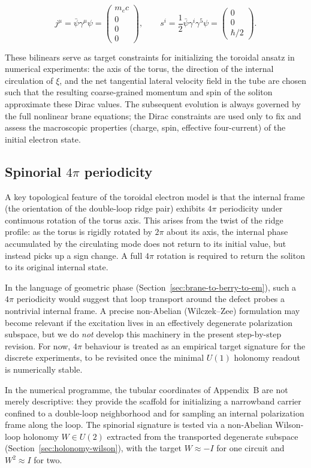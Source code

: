\begin{equation}
j^\mu = \bar\psi \gamma^\mu \psi
= \begin{pmatrix} m_e c \\ 0 \\ 0 \\ 0 \end{pmatrix},
\qquad
s^i = \frac{1}{2} \bar\psi \gamma^i \gamma^5 \psi
= \begin{pmatrix} 0 \\ 0 \\ \hbar/2 \end{pmatrix}.
\label{eq:dirac-rest-bilinears}
\end{equation}

These bilinears serve as target constraints for initializing the toroidal ansatz
in numerical experiments: the axis of the torus, the direction of the internal
circulation of $\xi$, and the net tangential lateral velocity field in the tube
are chosen such that the resulting coarse-grained momentum and spin of the
soliton approximate these Dirac values. The subsequent evolution is always
governed by the full nonlinear brane equations; the Dirac constraints are used
only to fix and assess the macroscopic properties (charge, spin, effective
four-current) of the initial electron state.

\subsection{Spinorial $4\pi$ periodicity}

A key topological feature of the toroidal electron model is that the internal
frame (the orientation of the double-loop ridge pair) exhibits $4\pi$
periodicity under continuous rotation of the torus axis. This arises from the
twist of the ridge profile: as the torus is rigidly rotated by $2\pi$ about its
axis, the internal phase accumulated by the circulating mode does not return to
its initial value, but instead picks up a sign change. A full $4\pi$ rotation is
required to return the soliton to its original internal state.

In the language of geometric phase (Section~\ref{sec:brane-to-berry-to-em}), such a $4\pi$ periodicity would suggest that
loop transport around the defect probes a nontrivial internal frame.
A precise non-Abelian (Wilczek--Zee) formulation may become relevant if the excitation lives in an effectively degenerate
polarization subspace, but we do \emph{not} develop this machinery in the present step-by-step revision.
For now, $4\pi$ behaviour is treated as an empirical target signature for the discrete experiments, to be revisited once the
minimal $U(1)$ holonomy readout is numerically stable.

In the numerical programme, the tubular coordinates of Appendix~B are not merely
descriptive: they provide the scaffold for initializing a narrowband carrier
confined to a double-loop neighborhood and for sampling an internal polarization
frame along the loop. The spinorial signature is tested via a non-Abelian
Wilson-loop holonomy $W\in U(2)$ extracted from the transported degenerate
subspace (Section~\ref{sec:holonomy-wilson}), with the target $W\approx -I$ for
one circuit and $W^2\approx I$ for two.